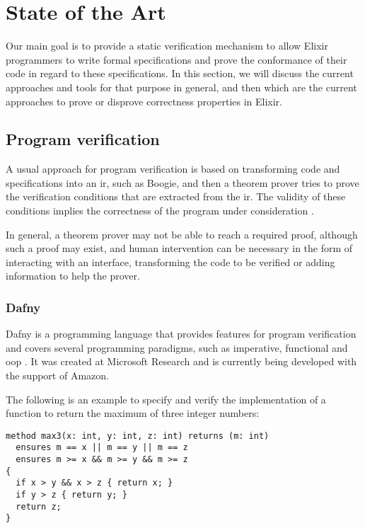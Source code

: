\chapter{State of the Art}
\label{cap:stateOfTheArt}


Our main goal is to provide a static verification mechanism to allow Elixir
programmers to write formal specifications and prove the conformance of their 
code in regard to these specifications. In this section, we will discuss the
current approaches and tools for that purpose in general, and then which are the
current approaches to prove or disprove correctness properties in Elixir.

\section{Program verification}

A usual approach for program verification is based on transforming code and
specifications into an \gls{ir}, such as Boogie, and then a theorem prover tries
to prove the verification conditions that are extracted from the \gls{ir}. The
validity of these conditions implies the correctness of the program under
consideration \citep{Boogie2}.

In general, a theorem prover may not be able to reach a required proof, although
such a proof may exist, and human intervention can be necessary in the form of
interacting with an interface, transforming the code to be verified or adding
information to help the prover.

\subsection{Dafny}

Dafny is a programming language that provides features for program verification
and covers several programming paradigms, such as imperative, functional and
\gls{oop} \citep{DafnyManual}.  It was created at Microsoft Research and is
currently being developed with the support of Amazon.

The following is an example to specify and verify the implementation of a
function to return the maximum of three integer numbers:

\begin{verbatim}
method max3(x: int, y: int, z: int) returns (m: int)
  ensures m == x || m == y || m == z
  ensures m >= x && m >= y && m >= z
{
  if x > y && x > z { return x; }
  if y > z { return y; }
  return z;
}
\end{verbatim}

